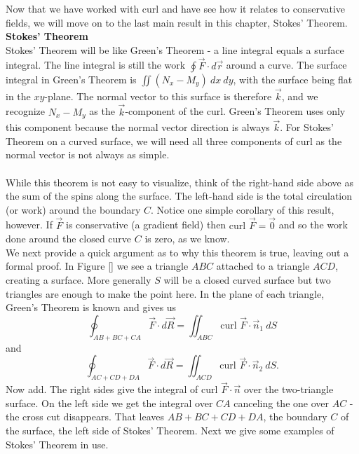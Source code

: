 Now that we have worked with curl and have see how it relates to conservative fields, we will move on to the last main result in this chapter, Stokes' Theorem.\\

\noindent\textbf{\large Stokes' Theorem}\\

Stokes' Theorem will be like Green's Theorem - a line integral equals a surface integral. The line integral is still the work $\displaystyle\oint \vec F \cdot d\vec r$ around a curve.  The surface integral in Green's Theorem is $\displaystyle\iint (N_x - M_y) \: dx \: dy$, with the surface being flat in the $xy$-plane. The normal vector to this surface is therefore $\vec k$, and we recognize $N_x - M_y$ as the $\vec k$-component of the curl.  Green's Theorem uses only this component because the normal vector direction is always $\vec k$.  For Stokes' Theorem on a curved surface, we will need all three components of curl as the normal vector is not always as simple.\\

\\

While this theorem is not easy to visualize, think of the right-hand side above as the sum of the spins along the surface.  The left-hand side is the total circulation (or work) around the boundary $C$.  Notice one simple corollary of this result, however.  If $\vec F$ is conservative (a gradient field) then $\text{curl } \vec F = \vec 0$ and so the work done around the closed curve $C$ is zero, as we know.\\

We next provide a quick argument as to why this theorem is true, leaving out a formal proof.  In Figure \ref{} we see a triangle $ABC$ attached to a triangle $ACD$, creating a surface.  More generally $S$ will be a closed curved surface but two triangles are enough to make the point here.  In the plane of each triangle, Green's Theorem is known and gives us
$$\oint_{AB+BC+CA} \vec F \cdot d\vec R = \iint_{ABC} \text{curl } \vec F \cdot \vec n_1 \: dS$$
and
$$\oint_{AC+CD+DA} \vec F \cdot d\vec R = \iint_{ACD} \text{curl } \vec F \cdot \vec n_2 \: dS.$$
Now add.  The right sides give the integral of $\text{curl } \vec F \cdot \vec n$ over the two-triangle surface.  On the left side we get the integral over $CA$ canceling the one over $AC$ - the cross cut disappears.  That leaves $AB + BC + CD + DA$, the boundary $C$ of the surface, the left side of Stokes' Theorem. Next we give some examples of Stokes' Theorem in use.\\

